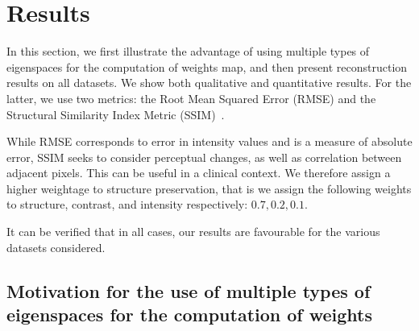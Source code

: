 \documentclass[journal]{IEEEtran}
\begin{document}
\section{Results}
\label{sec:results_spatially_varying_prior}


In this section, we first illustrate the advantage of using multiple
types of eigenspaces for the computation of weights map, and then
present reconstruction results on all datasets. We show both
qualitative and quantitative results. For the latter,
we use two metrics: the Root Mean Squared Error (RMSE) and the
Structural Similarity Index Metric (SSIM)~\cite{ssim}. 

While RMSE corresponds to error in intensity values and is a measure
of absolute error, SSIM seeks to consider perceptual changes, as well
as correlation between adjacent pixels. This can be useful in a
clinical context.  We therefore assign a higher weightage to structure
preservation, that is we assign the
following weights to structure, contrast, and intensity respectively:
$0.7,0.2,0.1$.

It can be verified that in all cases, our results are favourable for the
various datasets considered.


\subsection{Motivation for the use of multiple types of eigenspaces for the computation of weights}
\end{document}
